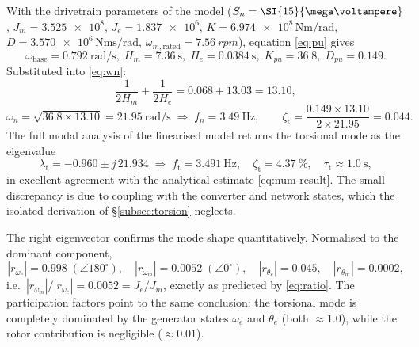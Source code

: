 With the drivetrain parameters of the model
($S_n = \SI{15}{\mega\voltampere}$, $J_m = \num{3.525e8}$,
$J_e = \num{1.837e6}$, $K = \num{6.974e8}\,\si{\newton\metre\per\radian}$,
$D = \num{3.570e6}\,\si{\newton\metre\second\per\radian}$,
$\omega_{m,\mathrm{rated}} = \SI{7.56}{rpm}$), equation \eqref{eq:pu} gives
\begin{equation}
  \omega_{\mathrm{base}} = \SI{0.792}{\radian\per\second},\;
  H_m = \SI{7.36}{\second},\;
  H_e = \SI{0.0384}{\second},\;
  K_{pu} = 36.8,\;
  D_{pu} = 0.149 .
  \label{eq:num-pu}
\end{equation}
Substituted into \eqref{eq:wn}:
\begin{equation}
  \frac{1}{2H_m}+\frac{1}{2H_e} = 0.068 + 13.03 = 13.10,
\end{equation}
\begin{equation}
  \omega_n = \sqrt{36.8 \times 13.10} = \SI{21.95}{\radian\per\second}
  \;\Rightarrow\; f_n = \SI{3.49}{\hertz},
  \qquad
  \zeta_{\mathrm{t}} = \frac{0.149 \times 13.10}{2 \times 21.95} = 0.044 .
  \label{eq:num-result}
\end{equation}
The full modal analysis of the linearised model returns the torsional mode as
the eigenvalue
\begin{equation}
  \lambda_{\mathrm{t}} = -0.960 \pm j\,21.934
  \;\Rightarrow\;
  f_{\mathrm{t}} = \SI{3.491}{\hertz},\quad
  \zeta_{\mathrm{t}} = \SI{4.37}{\percent},\quad
  \tau_{\mathrm{t}} \approx \SI{1.0}{\second},
  \label{eq:num-eig}
\end{equation}
in excellent agreement with the analytical estimate \eqref{eq:num-result}. The
small discrepancy is due to coupling with the converter and network states,
which the isolated derivation of \S\ref{subsec:torsion} neglects.

The right eigenvector confirms the mode shape quantitatively. Normalised to the
dominant component,
\begin{equation}
  |r_{\omega_e}| = 0.998\;(\angle 180^\circ), \quad
  |r_{\omega_m}| = 0.0052\;(\angle 0^\circ), \quad
  |r_{\theta_e}| = 0.045, \quad
  |r_{\theta_m}| = 0.0002,
  \label{eq:num-rev}
\end{equation}
i.e.\ $|r_{\omega_m}|/|r_{\omega_e}| = 0.0052 = J_e/J_m$, exactly as predicted
by \eqref{eq:ratio}. The participation factors point to the same conclusion:
the torsional mode is completely dominated by the generator states $\omega_e$
and $\theta_e$ (both $\approx 1.0$), while the rotor contribution is negligible
($\approx 0.01$).

